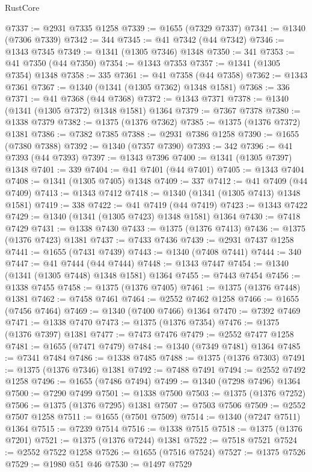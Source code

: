 \begin{lexlean}{RustCore}
\begin{coremodule}
@7337 := @2931 @7335 @1258
@7339 := @1655 (@7329 @7337)
@7341 := @1340 (@7306 @7339)
@7342 := 344
@7345 := @41 @7342 (@44 @7342)
@7346 := @1343 @7345
@7349 := @1341 (@1305 @7346) @1348
@7350 := 341
@7353 := @41 @7350 (@44 @7350)
@7354 := @1343 @7353
@7357 := @1341 (@1305 @7354) @1348
@7358 := 335
@7361 := @41 @7358 (@44 @7358)
@7362 := @1343 @7361
@7367 := @1340 (@1341 (@1305 @7362) @1348 @1581)
@7368 := 336
@7371 := @41 @7368 (@44 @7368)
@7372 := @1343 @7371
@7378 := @1340 (@1341 (@1305 @7372) @1348 @1581) @1364
@7379 := @7367 @7378
@7380 := @1338 @7379
@7382 := @1375 (@1376 @7362)
@7385 := @1375 (@1376 @7372) @1381
@7386 := @7382 @7385
@7388 := @2931 @7386 @1258
@7390 := @1655 (@7380 @7388)
@7392 := @1340 (@7357 @7390)
@7393 := 342
@7396 := @41 @7393 (@44 @7393)
@7397 := @1343 @7396
@7400 := @1341 (@1305 @7397) @1348
@7401 := 339
@7404 := @41 @7401 (@44 @7401)
@7405 := @1343 @7404
@7408 := @1341 (@1305 @7405) @1348
@7409 := 337
@7412 := @41 @7409 (@44 @7409)
@7413 := @1343 @7412
@7418 := @1340 (@1341 (@1305 @7413) @1348 @1581)
@7419 := 338
@7422 := @41 @7419 (@44 @7419)
@7423 := @1343 @7422
@7429 := @1340 (@1341 (@1305 @7423) @1348 @1581) @1364
@7430 := @7418 @7429
@7431 := @1338 @7430
@7433 := @1375 (@1376 @7413)
@7436 := @1375 (@1376 @7423) @1381
@7437 := @7433 @7436
@7439 := @2931 @7437 @1258
@7441 := @1655 (@7431 @7439)
@7443 := @1340 (@7408 @7441)
@7444 := 340
@7447 := @41 @7444 (@44 @7444)
@7448 := @1343 @7447
@7454 := @1340 (@1341 (@1305 @7448) @1348 @1581) @1364
@7455 := @7443 @7454
@7456 := @1338 @7455
@7458 := @1375 (@1376 @7405)
@7461 := @1375 (@1376 @7448) @1381
@7462 := @7458 @7461
@7464 := @2552 @7462 @1258
@7466 := @1655 (@7456 @7464)
@7469 := @1340 (@7400 @7466) @1364
@7470 := @7392 @7469
@7471 := @1338 @7470
@7473 := @1375 (@1376 @7354)
@7476 := @1375 (@1376 @7397) @1381
@7477 := @7473 @7476
@7479 := @2552 @7477 @1258
@7481 := @1655 (@7471 @7479)
@7484 := @1340 (@7349 @7481) @1364
@7485 := @7341 @7484
@7486 := @1338 @7485
@7488 := @1375 (@1376 @7303)
@7491 := @1375 (@1376 @7346) @1381
@7492 := @7488 @7491
@7494 := @2552 @7492 @1258
@7496 := @1655 (@7486 @7494)
@7499 := @1340 (@7298 @7496) @1364
@7500 := @7290 @7499
@7501 := @1338 @7500
@7503 := @1375 (@1376 @7252)
@7506 := @1375 (@1376 @7295) @1381
@7507 := @7503 @7506
@7509 := @2552 @7507 @1258
@7511 := @1655 (@7501 @7509)
@7514 := @1340 (@7247 @7511) @1364
@7515 := @7239 @7514
@7516 := @1338 @7515
@7518 := @1375 (@1376 @7201)
@7521 := @1375 (@1376 @7244) @1381
@7522 := @7518 @7521
@7524 := @2552 @7522 @1258
@7526 := @1655 (@7516 @7524)
@7527 := @1375 @7526
@7529 := @1980 @51 @46
@7530 := @1497 @7529

\end{coremodule}
\end{lexlean}
